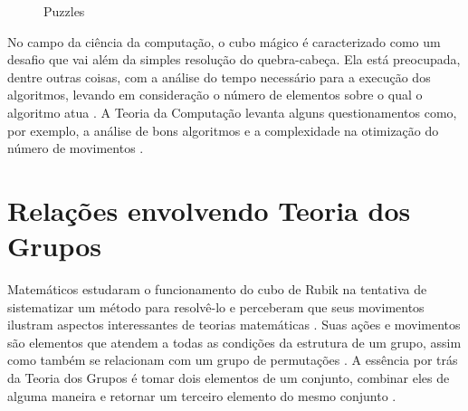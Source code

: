 \begin{figure}[!htb]
    \centering
    \quad %
    \quad %
\caption{Puzzles}
\label{fig:figPuzzles}
\end{figure}


No campo da ciência da computação, o cubo mágico é caracterizado como um desafio que vai além da simples resolução do quebra-cabeça. Ela está preocupada, dentre outras coisas, com a análise do tempo necessário para a execução dos algoritmos, levando em consideração o número de elementos sobre o qual o algoritmo atua \cite{hardesty}.
A Teoria da Computação levanta alguns questionamentos como, por exemplo, a análise de bons algoritmos e a complexidade na otimização do número de movimentos \cite{erik}. 

\section{Relações envolvendo Teoria dos Grupos}

Matemáticos estudaram o funcionamento do cubo de Rubik na tentativa de sistematizar um método para resolvê-lo e perceberam que seus movimentos ilustram aspectos interessantes de teorias matemáticas \cite{cinoto}. Suas ações e movimentos são elementos que atendem a todas as condições da estrutura de um grupo, assim como também se relacionam com um grupo de permutações \cite{luis}. A essência por trás da Teoria dos Grupos é tomar dois elementos de um conjunto, combinar eles de alguma maneira e retornar um terceiro elemento do mesmo conjunto \cite{galdino}.


